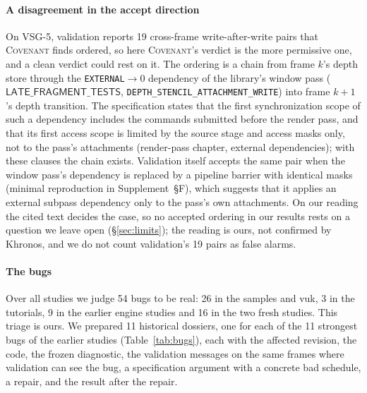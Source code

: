 \documentclass[acmtog,anonymous,review]{acmart}
\newcommand{\sys}{\textsc{Covenant}\xspace}
\newcommand{\code}[1]{\texttt{#1}}
\newcommand{\supp}[1]{Supplement~\S#1}
\begin{document}
\paragraph{A disagreement in the accept direction}
On VSG-5, validation reports 19 cross-frame write-after-write pairs that \sys finds ordered, so here \sys's verdict
is the more permissive one, and a clean verdict could rest on it. The ordering is a chain from frame $k$'s depth store
through the \code{EXTERNAL}$\to$0 dependency of the library's window pass ($\mathsf{LATE\_FRAGMENT\_TESTS}$,
\code{DEPTH\_STENCIL\_ATTACHMENT\_WRITE}) into frame $k{+}1$'s depth transition. The specification states that the
first synchronization scope of such a dependency includes the commands submitted before the render pass, and that its
first access scope is limited by the source stage and access masks only, not to the pass's attachments (render-pass
chapter, external dependencies); with these clauses the chain exists. Validation itself accepts the same pair when the
window pass's dependency is replaced by a pipeline barrier with identical masks (minimal reproduction in \supp{F}),
which suggests that it applies an external subpass dependency only to the pass's own attachments. On our reading the
cited text decides the case, so no accepted ordering in our results rests on a question we leave open
(\S\ref{sec:limits}); the reading is ours, not confirmed by Khronos, and we do not count validation's 19 pairs as
false alarms.

\paragraph{The bugs}
\label{sec:eval-bugs}
Over all studies we judge 54 bugs to be real: 26 in the samples and vuk, 3 in the tutorials, 9 in the earlier engine
studies and 16 in the two fresh studies. This triage is ours. We prepared 11 historical dossiers, one for each of the
11 strongest bugs of the earlier studies (Table~\ref{tab:bugs}), each with the affected revision, the code, the frozen diagnostic, the
validation messages on the same frames where validation can see the bug, a specification argument with a concrete bad
schedule, a repair, and the result after the repair.
\end{document}
